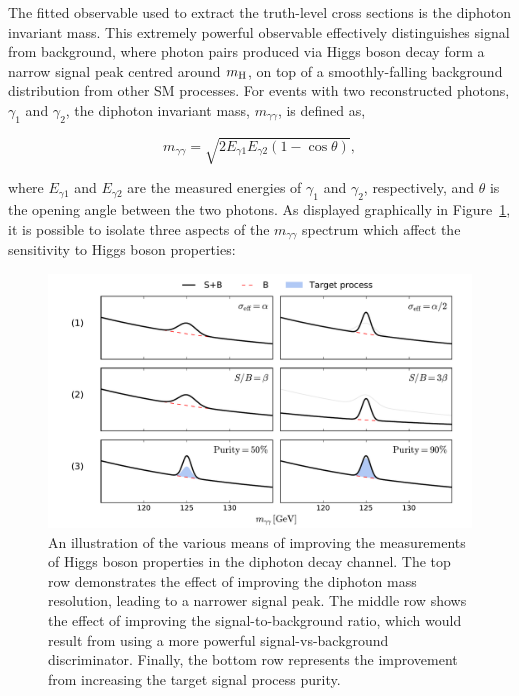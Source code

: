 The fitted observable used to extract the truth-level cross sections is the diphoton invariant mass. This extremely powerful observable effectively distinguishes signal from background, where photon pairs produced via Higgs boson decay form a narrow signal peak centred around $m_{\rm{H}}$, on top of a smoothly-falling background distribution from other SM processes. For events with two reconstructed photons, $\gamma_1$ and $\gamma_2$, the diphoton invariant mass, $m_{\gamma\gamma}$, is defined as,

\begin{equation}\label{eq:mgg}
    m_{\gamma\gamma} = \sqrt{2E_{\gamma1}E_{\gamma2}(1-\cos{\theta})},
\end{equation}

\noindent
where $E_{\gamma1}$ and $E_{\gamma2}$ are the measured energies of $\gamma_1$ and $\gamma_2$, respectively, and $\theta$ is the opening angle between the two photons. As displayed graphically in Figure~\ref{fig:hgg_overview_improving_measurements}, it is possible to isolate three aspects of the $m_{\gamma\gamma}$ spectrum which affect the sensitivity to Higgs boson properties: 

\begin{figure}[t]
  \centering
  \includegraphics[width=1\textwidth]{Figures/hgg_overview/hgg_improve_measurement.pdf}
  \caption[Avenues for improving \Hgg measurements.]
  {
    An illustration of the various means of improving the measurements of Higgs boson properties in the diphoton decay channel. The top row demonstrates the effect of improving the diphoton mass resolution, leading to a narrower signal peak. The middle row shows the effect of improving the signal-to-background ratio, which would result from using a more powerful signal-vs-background discriminator. Finally, the bottom row represents the improvement from increasing the target signal process purity.
  }
  \label{fig:hgg_overview_improving_measurements}
\end{figure}

